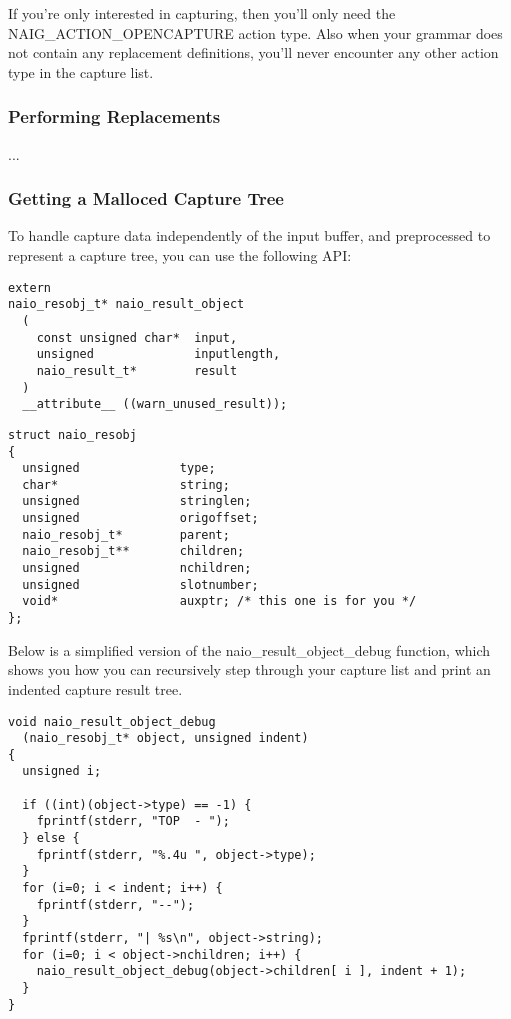 If you're only interested in capturing, then you'll only
need the NAIG\_ACTION\_OPENCAPTURE action type. Also when
your grammar does not contain any replacement definitions, you'll never
encounter any other action type in the capture list.

\subsubsection{Performing Replacements}

...

\subsubsection{Getting a Malloced Capture Tree}

To handle capture data independently of the input buffer, and
preprocessed to represent a capture tree, you can use the following API:

\begin{myquote}
\begin{verbatim}
extern
naio_resobj_t* naio_result_object
  (
    const unsigned char*  input,
    unsigned              inputlength,
    naio_result_t*        result
  )
  __attribute__ ((warn_unused_result));
\end{verbatim}
\end{myquote}

\begin{myquote}
\begin{verbatim}
struct naio_resobj
{
  unsigned              type;
  char*                 string;
  unsigned              stringlen;
  unsigned              origoffset;
  naio_resobj_t*        parent;
  naio_resobj_t**       children;
  unsigned              nchildren;
  unsigned              slotnumber;
  void*                 auxptr; /* this one is for you */
};
\end{verbatim}
\end{myquote}

Below is a simplified version of the naio\_result\_object\_debug function,
which shows you how you can recursively step through your capture
list and print an indented capture result tree.

\begin{myquote}
\begin{verbatim}
void naio_result_object_debug
  (naio_resobj_t* object, unsigned indent)
{
  unsigned i;

  if ((int)(object->type) == -1) {
    fprintf(stderr, "TOP  - ");
  } else {
    fprintf(stderr, "%.4u ", object->type);
  }
  for (i=0; i < indent; i++) {
    fprintf(stderr, "--");
  }
  fprintf(stderr, "| %s\n", object->string);
  for (i=0; i < object->nchildren; i++) {
    naio_result_object_debug(object->children[ i ], indent + 1);
  }
}
\end{verbatim}
\end{myquote}


